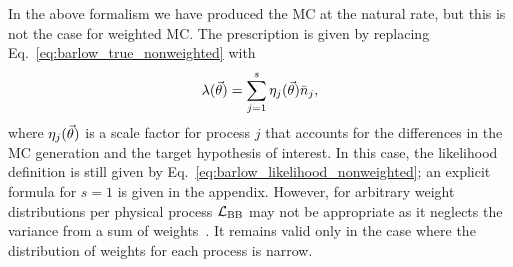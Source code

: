 In the above formalism we have produced the MC at the natural rate, but this is not the case for weighted MC. The prescription is given by replacing Eq.~\eqref{eq:barlow_true_nonweighted} with
\begin{equation}
\lambda(\vec{\theta}) = \sum_{j=1}^s \eta_{j}(\vec{\theta}) \bar n_j,
\label{eq:barlow_true_weighted}
\end{equation}
where $\eta_{j}(\vec{\theta})$ is a scale factor for process $j$ that accounts for the differences in the MC generation and the target hypothesis of interest. In this case, the likelihood definition is still given by Eq.~\eqref{eq:barlow_likelihood_nonweighted}; an explicit formula for $s=1$ is given in the appendix. However, for arbitrary weight distributions per physical process $\mathcal{L}_{\textmd{BB}}$ may not be appropriate as it neglects the variance from a sum of weights~\cite{Barlow:1993dm}. It remains valid only in the case where the distribution of weights for each process is narrow.

